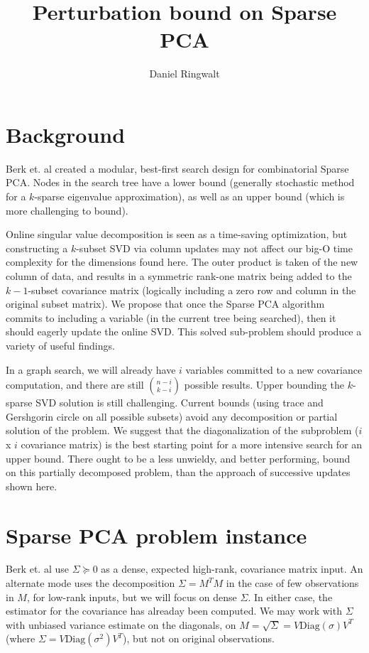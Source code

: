\documentclass{article}
\title{Perturbation bound on Sparse PCA}
\author{Daniel Ringwalt}
\begin{document}
	
\maketitle

\section{Background}

Berk et. al \cite{berk2019certifiably} created a modular, best-first search design for combinatorial Sparse PCA. Nodes in the search tree have a lower bound (generally stochastic method for a $k$-sparse eigenvalue approximation), as well as an upper bound (which is more challenging to bound).

Online singular value decomposition \cite{bunch1978updating} is seen as a time-saving optimization, but constructing a $k$-subset SVD via column updates may not affect our big-O time complexity for the dimensions found here. The outer product is taken of the new column of data, and results in a symmetric rank-one matrix being added to the $k-1$-subset covariance matrix (logically including a zero row and column in the original subset matrix). We propose that once the Sparse PCA algorithm commits to including a variable (in the current tree being searched), then it should eagerly update the online SVD. This solved sub-problem should produce a variety of useful findings.

In a graph search, we will already have $i$ variables committed to a new covariance computation, and there are still $\binom{n-i}{k-i}$ possible results. Upper bounding the $k$-sparse SVD solution is still challenging. Current bounds (using trace and Gershgorin circle on all possible subsets) avoid any decomposition or partial solution of the problem. We suggest that the diagonalization of the subproblem ($i$ x $i$ covariance matrix) is the best starting point for a more intensive search for an upper bound. There ought to be a less unwieldy, and better performing, bound on this partially decomposed problem, than the approach of successive updates shown here.

\section{Sparse PCA problem instance}

Berk et. al use $\Sigma \succeq 0$ as a dense, expected high-rank, covariance matrix input. An alternate mode uses the decomposition $\Sigma = M^T M$ in the case of few observations in $M$, for low-rank inputs, but we will focus on dense $\Sigma$. In either case, the estimator for the covariance has alreaday been computed. We may work with $\Sigma$ with unbiased variance estimate on the diagonals, on $M = \sqrt{\Sigma} = V \text{Diag}(\sigma) V^T$ (where $\Sigma = V \text{Diag}(\sigma^2) V^T$), but not on original observations.
\end{document}
